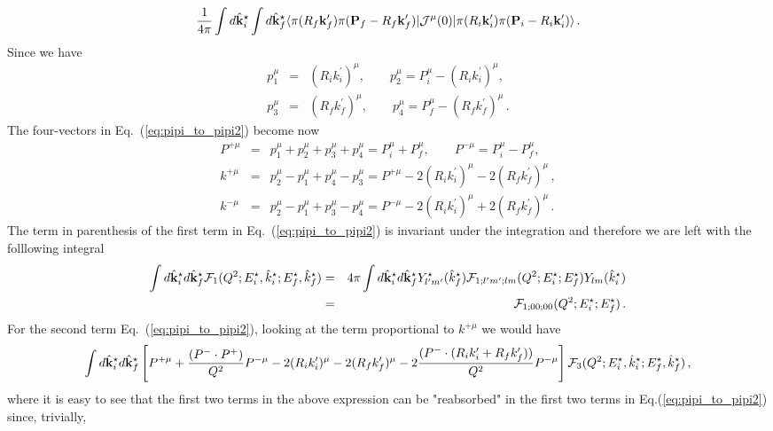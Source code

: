 {\begin{eqnarray}
\frac{1}{4\pi}\int d\hat{\bf k}_i^\star\int d\hat{\bf k}_f^\star\langle\pi(R_f{\bf k}_f^\prime)\pi({\bf P}_f-R_f{\bf k}_f^\prime)|{\cal J}^\mu(0)|\pi(R_i{\bf k}_i^\prime)\pi({\bf P}_i-R_i{\bf k}_i^\prime)\rangle\, .
\end{eqnarray}
Since we have
\begin{eqnarray}
p^\mu_1&=&(R_ik_i^\prime)^\mu,\qquad  p^\mu_2=P^\mu_i-(R_ik^\prime_i)^\mu,\\
 p^\mu_3&=&(R_fk_f^\prime)^\mu,\qquad p^\mu_4=P^\mu_f-(R_fk_f^\prime)^\mu\, .
\end{eqnarray}
The four-vectors in Eq.~(\ref{eq:pipi_to_pipi2}) become now
\begin{eqnarray}
P^{+\mu}&=&p^\mu_1+p^\mu_2+p^\mu_3+p^\mu_4=P^\mu_i+P^\mu_f,\qquad P^{-\mu}=P^\mu_i-P^\mu_f,\\
 k^{+\mu}&=&p^\mu_2-p^\mu_1+p^\mu_4-p^\mu_3=P^{+\mu}-2(R_ik_i^\prime)^\mu-2(R_fk_f^\prime)^\mu\, ,\\
  k^{-\mu}&=&p^\mu_2-p^\mu_1+p^\mu_3-p^\mu_4=P^{-\mu}-2(R_ik_i^\prime)^\mu+2(R_fk_f^\prime)^\mu\, .
\end{eqnarray}
The term in parenthesis of the first term in Eq.~(\ref{eq:pipi_to_pipi2}) is invariant under the integration and therefore we are left with the folllowing integral
\begin{eqnarray}
\int d\hat{{\bf k}}^\star_id\hat{{\bf k}}^\star_f{\cal F}_1(Q^2;E_i^\star,{\hat k}^\star_i;E_f^\star,\hat{k}^\star_f)&=&4\pi\int d\hat{{\bf k}}^\star_id\hat{{\bf k}}^\star_f Y^\star_{l^\prime m^\prime}(\hat{k}^\star_f){\cal F}_{1;l^\prime m^\prime;lm}(Q^2;E_i^\star;E_f^\star)Y_{lm}(\hat{k}^\star_i) \\
&=&{\cal F}_{1;00;00}(Q^2;E_i^\star;E_f^\star)\, .
\end{eqnarray}
For the second term Eq.~(\ref{eq:pipi_to_pipi2}), looking at the term proportional to $k^{+\mu}$ we would have
\begin{eqnarray}
\int d\hat{{\bf k}}^\star_id\hat{{\bf k}}^\star_f\left[P^{+\mu}+\frac{(P^{-}\cdot P^{+}) }{Q^2}P^{-\mu}-2(R_ik_i^\prime)^\mu-2(R_fk_f^\prime)^\mu-2\frac{(P^{-}\cdot(R_ik_i^\prime+R_fk_f^\prime))}{Q^2} P^{-\mu}\right]{\cal F}_3(Q^2;E_i^\star,{\hat k}_i^\star;E_f^\star,\hat{k}^\star_f)\, ,\label{eq:full_dec_2nd}
\end{eqnarray}
where 
it is easy to see that the first two terms in the above expression can be "reabsorbed" in the first two terms in Eq.(\ref{eq:pipi_to_pipi2}) since, trivially,
\begin{eqnarray}

\end{eqnarray}}
